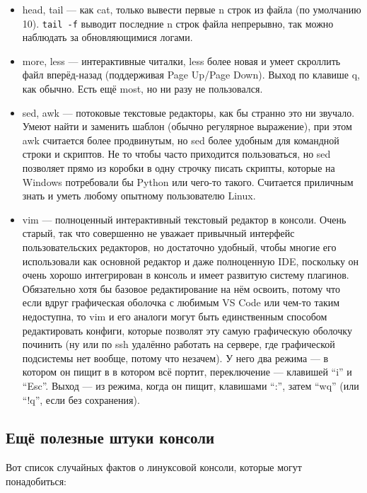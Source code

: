 \documentclass{../../text-style}
\begin{document}
\begin{itemize}
    \item head, tail --- как cat, только вывести первые n строк из файла (по умолчанию 10).
        \verb|tail -f| выводит последние n строк файла непрерывно, так можно наблюдать за обновляющимися логами.
    \item more, less --- интерактивные читалки, less более новая и умеет скроллить файл вперёд-назад (поддерживая Page Up/Page Down).
        Выход по клавише q, как обычно.
        Есть ещё most, но ни разу не пользовался.
    \item sed, awk --- потоковые текстовые редакторы, как бы странно это ни звучало.
        Умеют найти и заменить шаблон (обычно регулярное выражение), при этом awk считается более продвинутым, но sed более удобным для командной строки и скриптов.
        Не то чтобы часто приходится пользоваться, но sed позволяет прямо из коробки в одну строчку писать скрипты, которые на Windows потребовали бы Python или чего-то такого.
        Считается приличным знать и уметь любому опытному пользователю Linux.
    \item vim --- полноценный интерактивный текстовый редактор в консоли.
        Очень старый, так что совершенно не уважает привычный интерфейс пользовательских редакторов, но достаточно удобный, чтобы многие его использовали как основной редактор и даже полноценную IDE, поскольку он очень хорошо интегрирован в консоль и имеет развитую систему плагинов.
        Обязательно хотя бы базовое редактирование на нём освоить, потому что если вдруг графическая оболочка с любимым VS Code или чем-то таким недоступна, то vim и его аналоги могут быть единственным способом редактировать конфиги, которые позволят эту самую графическую оболочку починить (ну или по ssh удалённо работать на сервере, где графической подсистемы нет вообще, потому что незачем).
        У него два режима --- в котором он пищит в в котором всё портит, переключение --- клавишей \enquote{i} и \enquote{Esc}.
        Выход --- из режима, когда он пищит, клавишами \enquote{:}, затем \enquote{wq} (или \enquote{!q}, если без сохранения).
\end{itemize}

\subsection{Ещё полезные штуки консоли}

Вот список случайных фактов о линуксовой консоли, которые могут понадобиться:
\end{document}
